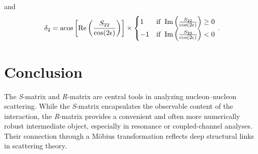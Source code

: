 \documentclass[10pt,a4paper]{article}
\begin{document}
	and 
	\begin{equation}
		\delta_2 =
		\acos\left[\Re\left(\frac{S_{22}}{\cos(2\epsilon)}\right)\right]
		\times
		\begin{cases}
			1 & \mathrm{if~}\Im\left(\frac{S_{22}}{\cos(2\epsilon)}\right) \ge 0 \\
			-1 & \mathrm{if~}\Im\left(\frac{S_{22}}{\cos(2\epsilon)}\right) < 0
		\end{cases}\,.
	\end{equation}
	
	
	
	\section{Conclusion}
	
	The \textit{S}-matrix and \textit{R}-matrix are central tools in analyzing nucleon--nucleon scattering. While the \textit{S}-matrix encapsulates the observable content of the interaction, the \textit{R}-matrix provides a convenient and often more numerically robust intermediate object, especially in resonance or coupled-channel analyses. Their connection through a M\"obius transformation reflects deep structural links in scattering theory.
	
\end{document}
